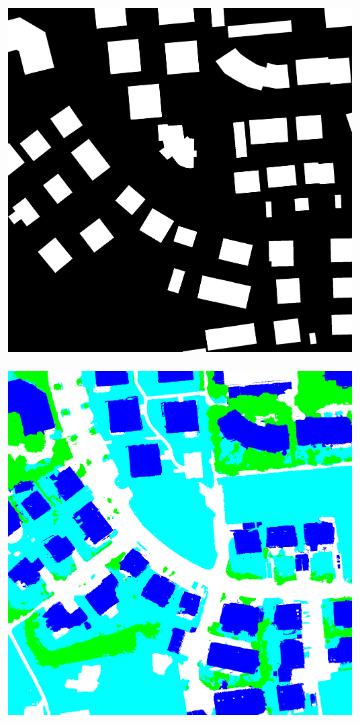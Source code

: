 \begin{figure}[htb]
\begin{subfigure}{0.19\textwidth}
  \caption{}
\end{subfigure}
\begin{subfigure}{0.19\textwidth}
  \centering
  \includegraphics[width=1\linewidth]{fig/vai/37_osm.jpg}
  \caption{}
\end{subfigure}
\begin{subfigure}{0.19\textwidth}
  \centering
  \includegraphics[width=1\linewidth]{fig/vai/37_anno.png}

\end{subfigure}
\end{figure}
